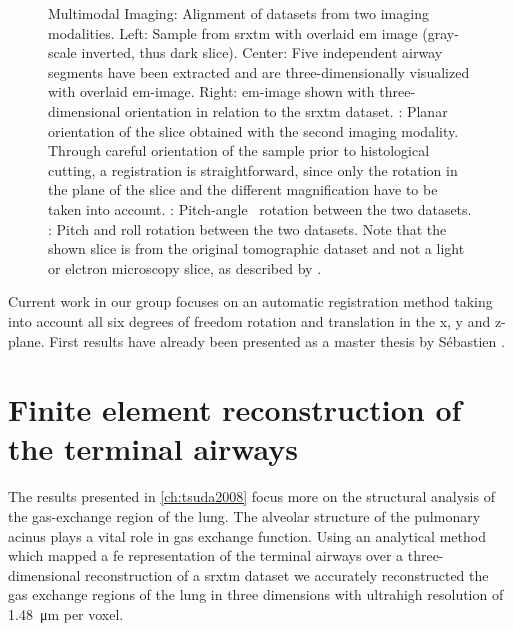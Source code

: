 \begin{figure}
{{%
			\label{subfig:correlation-arbitrary3}%
			}%
		}%
	\caption[Multimodal Imaging]{Multimodal Imaging: Alignment of datasets from two imaging modalities. Left: Sample from \ac{srxtm} with overlaid \ac{em} image (gray-scale inverted, thus dark slice). Center: Five independent airway segments have been extracted and are three-dimensionally visualized with overlaid \ac{em}-image. Right: \ac{em}-image shown with three-dimensional orientation in relation to the \ac{srxtm} dataset. : Planar orientation of the slice obtained with the second imaging modality. Through careful orientation of the sample prior to histological cutting, a registration is straightforward, since only the rotation in the plane of the slice and the different magnification have to be taken into account. : Pitch-angle~\cite{YawPitchRoll} rotation between the two datasets. : Pitch and roll rotation between the two datasets. Note that the shown slice is from the original tomographic dataset and not a light or elctron microscopy slice, as described by \cite{Barre2009}.}%
	\label{fig:correlation}%
\end{figure}

Current work in our group focuses on an automatic registration method taking into account all six degrees of freedom \ie rotation and translation in the x, y and z-plane. First results have already been presented as a master thesis by Sébastien \citet{Barre2009}.

\section{Finite element reconstruction of the terminal airways}
The results presented in \autoref{ch:tsuda2008} focus more on the structural analysis of the gas-exchange region of the lung. The alveolar structure of the pulmonary acinus plays a vital role in gas exchange function. Using an analytical method which mapped a \ac{fe} representation of the terminal airways over a three-dimensional reconstruction of a \ac{srxtm} dataset we accurately reconstructed the gas exchange regions of the lung in three dimensions with ultrahigh resolution of \SI{1.48}{\micro\meter} per voxel.

